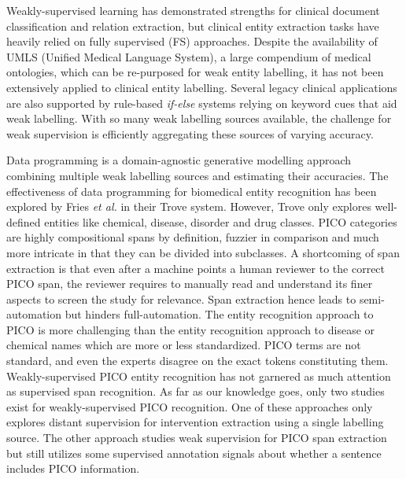 \documentclass[10.7pt,]{article}
\begin{document}
Weakly-supervised learning has demonstrated strengths for clinical document classification and relation extraction, but clinical entity extraction tasks have heavily relied on fully supervised (FS) approaches.\cite{meng2018weakly,wang2019clinical,mintz2009distant,elangovan2020assigning,weber2020pedl,mallory2020extracting}
Despite the availability of UMLS (Unified Medical Language System), a large compendium of medical ontologies, which can be re-purposed for weak entity labelling, it has not been extensively applied to clinical entity labelling.\cite{humphreys1998unified}
Several legacy clinical applications are also supported by rule-based \textit{if-else} systems relying on keyword cues that aid weak labelling.\cite{friedlin2008software,kim2017extracting,yang2015automatic}
With so many weak labelling sources available, the challenge for weak supervision is efficiently aggregating these sources of varying accuracy.



Data programming is a domain-agnostic generative modelling approach combining multiple weak labelling sources and estimating their accuracies.
The effectiveness of data programming for biomedical entity recognition has been explored by Fries \textit{et al.} in their Trove system.\cite{fries2021ontology}
However, Trove only explores well-defined entities like chemical, disease, disorder and drug classes.
PICO categories are highly compositional spans by definition, fuzzier in comparison and much more intricate in that they can be divided into subclasses.
A shortcoming of span extraction is that even after a machine points a human reviewer to the correct PICO span, the reviewer requires to manually read and understand its finer aspects to screen the study for relevance.
Span extraction hence leads to semi-automation but hinders full-automation.
The entity recognition approach to PICO is more challenging than the entity recognition approach to disease or chemical names which are more or less standardized.
PICO terms are not standard, and even the experts disagree on the exact tokens constituting them.\cite{brockmeier2019improving}
Weakly-supervised PICO entity recognition has not garnered as much attention as supervised span recognition.
As far as our knowledge goes, only two studies exist for weakly-supervised PICO recognition.
One of these approaches only explores distant supervision for intervention extraction using a single labelling source.\cite{dhrangadhariya2022distant}
The other approach studies weak supervision for PICO span extraction but still utilizes some supervised annotation signals about whether a sentence includes PICO information.\cite{liu2021sent2span}
\end{document}
